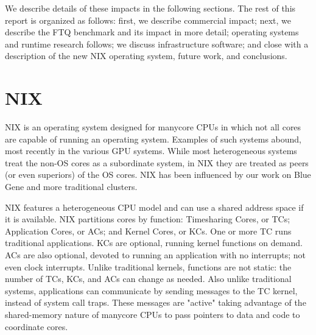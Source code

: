 \documentclass{report}
\begin{document}
We describe details of these impacts in the following sections. The rest of this 
report is organized as follows: first, we describe commercial impact; next, 
we describe the FTQ benchmark and its impact in more detail; operating systems
and runtime research follows; we discuss infrastructure software; and close with a 
description of the new NIX  operating system, future work, and conclusions. 






\chapter{NIX}

NIX is an operating system designed for manycore CPUs in which not 
all cores are capable of running an operating system. Examples of such 
systems abound, most recently in the various GPU systems. While most 
heterogeneous systems treat the non-OS cores as a subordinate system, 
in NIX they are treated as peers (or even superiors) of the 
OS cores. NIX has been influenced by our work on Blue Gene and more traditional
clusters.  

NIX
features a heterogeneous CPU model and can use a shared address space
if it is available. 
NIX partitions cores by function: Timesharing Cores, or
TCs; Application Cores, or ACs; and Kernel Cores, or KCs.  One or more
TC runs traditional applications.  KCs are optional, running kernel
functions on demand.  ACs are also optional, devoted to running an
application with no interrupts; not even clock interrupts.  Unlike
traditional kernels, functions are not static: the number of TCs, KCs,
and ACs can change as needed.  Also unlike traditional
systems, applications can communicate by sending messages to the TC
kernel, instead of system call traps.  These messages are "active"
taking advantage of the shared-memory nature of manycore CPUs to pass
pointers to data and code to coordinate cores.
\end{document}
